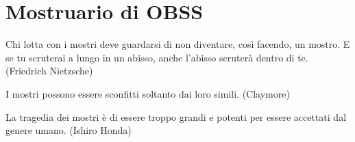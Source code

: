 \section{Mostruario di OBSS}

\begin{changemargin}{0.3cm}{0.3cm}\begin{enfasi}{Chi lotta con i mostri deve guardarsi di non diventare, così facendo, un mostro. E se tu scruterai a lungo in un abisso, anche l'abisso scruterà dentro di te. (Friedrich Nietzsche)

\medskip

I mostri possono essere sconfitti soltanto dai loro simili. (Claymore)

\medskip

La tragedia dei mostri è di essere troppo grandi e potenti per essere accettati dal genere umano. (Ishiro Honda)}\end{enfasi}\end{changemargin}\medskip

